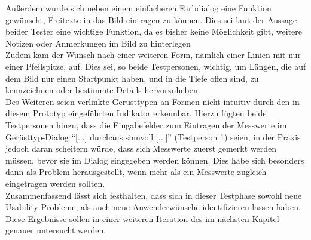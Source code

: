 Außerdem wurde sich neben einem einfacheren Farbdialog eine Funktion gewünscht, Freitexte in das Bild eintragen zu können. 
Dies sei laut der Aussage beider Tester eine wichtige Funktion, da es bisher keine Möglichkeit gibt, weitere Notizen oder Anmerkungen im Bild zu hinterlegen \\

Zudem kam der Wunsch nach einer weiteren Form, nämlich einer Linien mit nur einer Pfeilspitze, auf.
Dies sei, so beide Testpersonen, wichtig, um Längen, die auf dem Bild nur einen Startpunkt haben, und in die Tiefe offen sind, zu kennzeichnen oder bestimmte Details hervorzuheben. \\

Des Weiteren seien verlinkte Gerüsttypen an Formen nicht intuitiv durch den in diesem Prototyp eingeführten Indikator erkennbar.
Hierzu fügten beide Testpersonen hinzu, dass die Eingabefelder zum Eintragen der Messwerte im Gerüsttyp-Dialog ``[...] durchaus sinnvoll [...]'' (Testperson 1) seien, in der Praxis jedoch daran scheitern würde, dass sich Messwerte zuerst gemerkt werden müssen, bevor sie im Dialog eingegeben werden können.
Dies habe sich besonders dann als Problem herausgestellt, wenn mehr als ein Messwerte zugleich eingetragen werden sollten. \\

Zusammenfassend lässt sich festhalten, dass sich in dieser Testphase sowohl neue Usability-Probleme, als auch neue Anwenderwünsche identifizieren lassen haben.
Diese Ergebnisse sollen in einer weiteren Iteration des \hcdp{} im nächsten Kapitel genauer untersucht werden.
